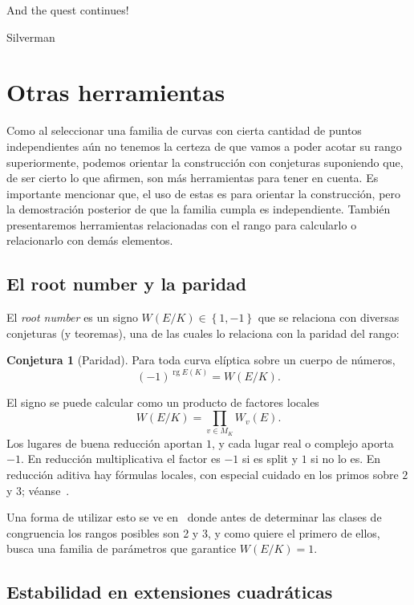 \documentclass[a4paper]{book}
\theoremstyle{definition}
\newtheorem*{conjecture*}{Conjetura}
\theoremstyle{plain}
\DeclareMathOperator{\rg}{rg}
\newcommand{\lla}{\left\lbrace}
\newcommand{\rla}{\right\rbrace}
\begin{document}
\epigraph{
And the quest continues!
}{
Silverman
}

\section{Otras herramientas}\label{sec:conjeturasSuperficies}

Como al seleccionar una familia de curvas con cierta cantidad de puntos independientes aún no tenemos la certeza de que vamos a poder acotar su rango superiormente, podemos orientar la construcción con conjeturas suponiendo que, de ser cierto lo que afirmen, son más herramientas para tener en cuenta. Es importante mencionar que, el uso de estas es para orientar la construcción, pero la demostración posterior de que la familia cumpla es independiente. También presentaremos herramientas relacionadas con el rango para calcularlo o relacionarlo con demás elementos.

\subsection*{El root number y la paridad}

El \emph{root number} es un signo $W(E/K)\in\lla1,-1\rla$ que se relaciona con diversas conjeturas (y teoremas), una de las cuales lo relaciona con la paridad del rango:

\begin{conjecture*}[Paridad]
Para toda curva elíptica sobre un cuerpo de números,
\[
{(-1)}^{\rg E(K)}=W(E/K).
\]
\end{conjecture*}

El signo se puede calcular como un producto de factores locales
\[
W(E/K)=\prod_{v\in M_K}W_v(E).
\]
Los lugares de buena reducción aportan $1$, y cada lugar real o complejo aporta $-1$. En reducción multiplicativa el factor es $-1$ si es split y $1$ si no lo es. En reducción aditiva hay fórmulas locales, con especial cuidado en los primos sobre $2$ y $3$; véanse~\cite[apéndice C, sección~16]{SilvermanAEC}.

Una forma de utilizar esto se ve en~\cite{Zywina2025RankTwo} donde antes de determinar las clases de congruencia los rangos posibles son 2 y 3, y como quiere el primero de ellos, busca una familia de parámetros que garantice $W(E/K)=1$.

\subsection*{Estabilidad en extensiones cuadráticas}
\end{document}
